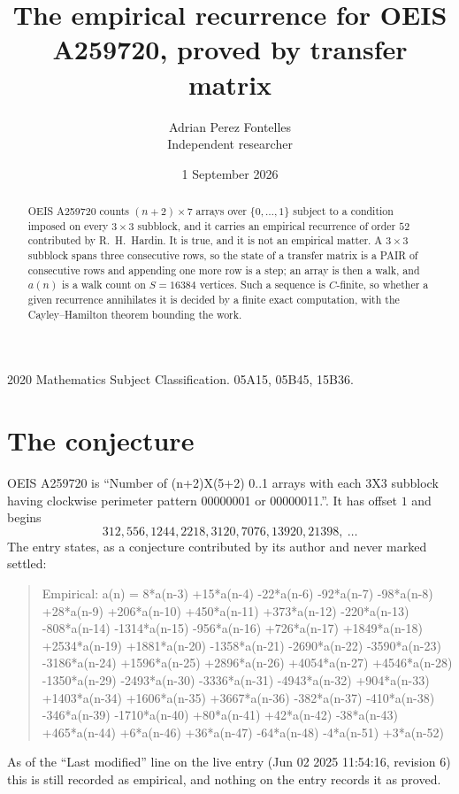 \documentclass[11pt,a4paper]{article}
\title{The empirical recurrence for OEIS A259720, proved by transfer matrix}
\author{Adrian Perez Fontelles\\ \small Independent researcher}
\date{1 September 2026}
\theoremstyle{plain}
\theoremstyle{definition}
\begin{document}
\maketitle

\begin{abstract}
OEIS A259720 counts $(n+2)\times7$ arrays over $\{0,\dots,1\}$ subject to a condition imposed on
every $3\times3$ subblock, and it carries an empirical recurrence of order $52$
contributed by R.~H.~Hardin. It is true, and it is not an empirical matter. A $3\times3$
subblock spans three consecutive rows, so the state of a transfer matrix is a PAIR of
consecutive rows and appending one more row is a step; an array is then a walk, and
$a(n)$ is a walk count on $S=16384$ vertices. Such a sequence is $C$-finite, so whether a given
recurrence annihilates it is decided by a finite exact computation, with the Cayley--Hamilton
theorem bounding the work.
\end{abstract}

\noindent\small 2020 Mathematics Subject Classification. 05A15, 05B45, 15B36.\normalsize

\section{The conjecture}

OEIS A259720 is ``Number of (n+2)X(5+2) 0..1 arrays with each 3X3 subblock having clockwise perimeter pattern 00000001 or 00000011.''. It has offset $1$ and begins
\[
312, 556, 1244, 2218, 3120, 7076, 13920, 21398,\ \dots
\]
The entry states, as a conjecture contributed by its author and never marked settled:
\begin{quote}
Empirical: a(n) = 8*a(n-3) +15*a(n-4) -22*a(n-6) -92*a(n-7) -98*a(n-8) +28*a(n-9) +206*a(n-10) +450*a(n-11) +373*a(n-12) -220*a(n-13) -808*a(n-14) -1314*a(n-15) -956*a(n-16) +726*a(n-17) +1849*a(n-18) +2534*a(n-19) +1881*a(n-20) -1358*a(n-21) -2690*a(n-22) -3590*a(n-23) -3186*a(n-24) +1596*a(n-25) +2896*a(n-26) +4054*a(n-27) +4546*a(n-28) -1350*a(n-29) -2493*a(n-30) -3336*a(n-31) -4943*a(n-32) +904*a(n-33) +1403*a(n-34) +1606*a(n-35) +3667*a(n-36) -382*a(n-37) -410*a(n-38) -346*a(n-39) -1710*a(n-40) +80*a(n-41) +42*a(n-42) -38*a(n-43) +465*a(n-44) +6*a(n-46) +36*a(n-47) -64*a(n-48) -4*a(n-51) +3*a(n-52)
\end{quote}
As of the ``Last modified'' line on the live entry (Jun 02 2025 11:54:16, revision 6) this is still
recorded as empirical, and nothing on the entry records it as proved.
\end{document}
